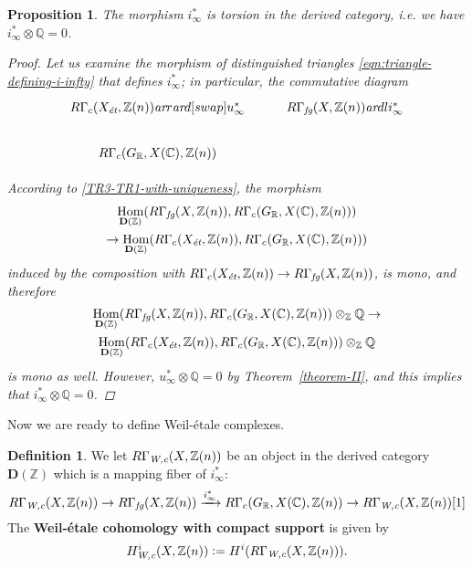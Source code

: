 \documentclass[leqno,12pt]{article}
\theoremstyle{plain}
\newtheorem{proposition}[theorem]{\indent\sc Proposition}
\theoremstyle{definition}
\newtheorem{definition}[theorem]{\indent\sc Definition}
\DeclareMathOperator{\Hom}{Hom}
\newcommand{\ZZ}{\mathbb{Z}}
\newcommand{\QQ}{\mathbb{Q}}
\newcommand{\RR}{\mathbb{R}}
\newcommand{\CC}{\mathbb{C}}
\newcommand{\dfn}{\mathrel{\mathop:}=}
\newcommand{\Wc}{\text{\it W,c}}
\newcommand{\et}{\text{\it \'{e}t}}
\newcommand{\fg}{\text{\it fg}}
\newcommand{\ar}{\text{\it ar}}
\begin{document}
\begin{proposition}
  \label{i-infty-is-torsion}
  The morphism $i_\infty^*$ is torsion in the derived category,
  i.e. we have $i_\infty^*\otimes \QQ = 0$.

  \begin{proof}
    Let us examine the morphism of distinguished triangles
    \eqref{eqn:triangle-defining-i-infty} that defines $i_\infty^*$; in
    particular, the commutative diagram
    \[ \begin{tikzcd}
      R\Gamma_c (X_\et, \ZZ (n)) \ar{r}\ar{d}[swap]{u_\infty^*} & R\Gamma_\fg (X, \ZZ (n))\ar{dl}{i_\infty^*} \\
      R\Gamma_c (G_\RR, X (\CC), \ZZ (n))
    \end{tikzcd} \]

    According to \ref{TR3-TR1-with-uniqueness}, the morphism
    \begin{multline*}
      \Hom_{\mathbf{D} (\ZZ)} (R\Gamma_\fg (X,\ZZ (n)), R\Gamma_c (G_\RR, X (\CC), \ZZ (n))) \\
      \to
      \Hom_{\mathbf{D} (\ZZ)} (R\Gamma_c (X_\et, \ZZ (n)), R\Gamma_c (G_\RR, X (\CC), \ZZ (n)))
    \end{multline*}
    induced by the composition with
    $R\Gamma_c (X_\et, \ZZ (n)) \to R\Gamma_\fg (X,\ZZ (n))$, is mono, and
    therefore
    \begin{multline*}
      \Hom_{\mathbf{D} (\ZZ)} (R\Gamma_\fg (X,\ZZ (n)), R\Gamma_c (G_\RR, X (\CC), \ZZ (n)))\otimes_\ZZ \QQ \to\\
      \Hom_{\mathbf{D} (\ZZ)} (R\Gamma_c (X_\et, \ZZ (n)), R\Gamma_c (G_\RR, X (\CC), \ZZ (n)))\otimes_\ZZ \QQ
    \end{multline*}
    is mono as well. However, $u_\infty^*\otimes \QQ = 0$ by
    Theorem~\ref{theorem-II}, and this implies that $i_\infty^*\otimes \QQ = 0$.
  \end{proof}
\end{proposition}

Now we are ready to define Weil-\'{e}tale complexes.

\begin{definition}
  \label{dfn:RGammaWc}
  We let
  $R\Gamma_\Wc (X,\ZZ(n))$ be an object in the derived category
  $\mathbf{D} (\ZZ)$ which is a mapping fiber of $i_\infty^*$:
  \[ R\Gamma_\Wc (X,\ZZ(n)) \to
  R\Gamma_\fg (X, \ZZ (n)) \xrightarrow{i_\infty^*}
  R\Gamma_c (G_\RR, X (\CC), \ZZ (n)) \to
  R\Gamma_\Wc (X,\ZZ(n)) [1] \]
  The \textbf{Weil-\'{e}tale cohomology with compact support} is given by
  $$H_\Wc^i (X, \ZZ (n)) \dfn H^i (R\Gamma_\Wc (X,\ZZ(n))).$$
\end{definition}
\end{document}
